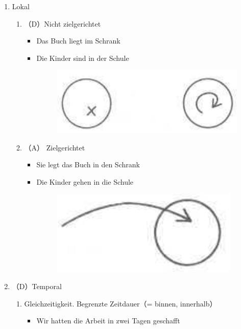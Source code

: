 \documentclass[UTF8]{report}
\begin{document}
\begin{enumerate}
    \item Lokal
    \begin{enumerate}
        \item （D）Nicht zielgerichtet
        \begin{itemize}
            \item Das Buch liegt im Schrank
            \item Die Kinder sind in der Schule
            \begin{figure}[H]
                \centering
                \includegraphics[scale=0.3]{in.png}
            \end{figure}
        \end{itemize}
        \item（A） Zielgerichtet
        \begin{itemize}
            \item Sie legt das Buch in den Schrank
            \item Die Kinder gehen in die Schule
            \begin{figure}[H]
                \centering
                \includegraphics[scale=0.3]{in2.png}
            \end{figure}
        \end{itemize}
    \end{enumerate}
    \item （D）Temporal
    \begin{enumerate}
        \item Gleichzeitigkeit. Begrenzte Zeitdauer（= binnen, innerhalb）
        \begin{itemize}
            \item Wir hatten die Arbeit in zwei Tagen geschafft

\end{itemize}
\end{enumerate}
\end{enumerate}
\end{document}
